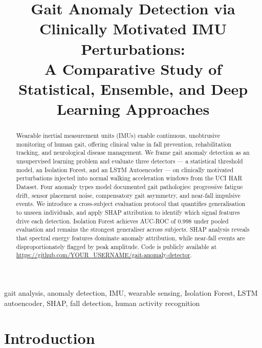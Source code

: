 \documentclass[conference]{IEEEtran}
\begin{document}
\title{Gait Anomaly Detection via Clinically Motivated IMU Perturbations:\\
A Comparative Study of Statistical, Ensemble, and Deep Learning Approaches}

\author{
}

\maketitle

\begin{abstract}
Wearable inertial measurement units (IMUs) enable continuous, unobtrusive
monitoring of human gait, offering clinical value in fall prevention,
rehabilitation tracking, and neurological disease management.
We frame gait anomaly detection as an unsupervised learning problem and
evaluate three detectors — a statistical threshold model, an Isolation
Forest, and an LSTM Autoencoder — on clinically motivated perturbations
injected into normal walking acceleration windows from the UCI HAR Dataset.
Four anomaly types model documented gait pathologies: progressive fatigue
drift, sensor placement noise, compensatory gait asymmetry, and near-fall
impulsive events.
We introduce a cross-subject evaluation protocol that quantifies
generalisation to unseen individuals, and apply SHAP attribution to
identify which signal features drive each detection.
Isolation Forest achieves AUC-ROC of 0.998 under pooled evaluation and
remains the strongest generaliser across subjects.
SHAP analysis reveals that spectral energy features dominate anomaly
attribution, while near-fall events are disproportionately flagged by peak
amplitude.
Code is publicly available at
\url{https://github.com/YOUR_USERNAME/gait-anomaly-detector}.
\end{abstract}

\begin{IEEEkeywords}
gait analysis, anomaly detection, IMU, wearable sensing,
Isolation Forest, LSTM autoencoder, SHAP, fall detection,
human activity recognition
\end{IEEEkeywords}

\section{Introduction}
\end{document}
